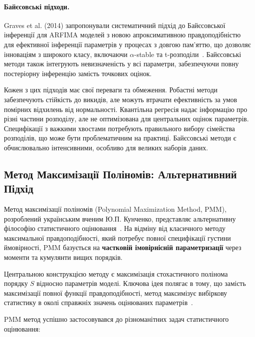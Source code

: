 \documentclass[12pt,a4paper]{article}
\begin{document}
\paragraph{Байєсовські підходи.} Graves et al. (2014) запропонували систематичний підхід до Байєсовської інференції для ARFIMA моделей з новою апроксимативною правдоподібністю для ефективної інференції параметрів у процесах з довгою пам'яттю, що дозволяє інноваціям з широкого класу, включаючи $\alpha$-stable та t-розподіли~\cite{graves2014efficient}. Байєсовські методи також інтегрують невизначеність у всі параметри, забезпечуючи повну постеріорну інференцію замість точкових оцінок.

Кожен з цих підходів має свої переваги та обмеження. Робастні методи забезпечують стійкість до викидів, але можуть втрачати ефективність за умов помірних відхилень від нормальності. Квантільна регресія надає інформацію про різні частини розподілу, але не оптимізована для центральних оцінок параметрів. Специфікації з важкими хвостами потребують правильного вибору сімейства розподілів, що може бути проблематичним на практиці. Байєсовські методи є обчислювально інтенсивними, особливо для великих наборів даних.

\subsection{Метод Максимізації Поліномів: Альтернативний Підхід}
\label{subsec:pmm_intro}

Метод максимізації поліномів (Polynomial Maximization Method, PMM), розроблений українським вченим Ю.П. Кунченко, представляє альтернативну філософію статистичного оцінювання~\cite{kunchenko1991estimation,kunchenko2002polynomial}. На відміну від класичного методу максимальної правдоподібності, який потребує повної специфікації густини ймовірності, PMM базується на \textbf{частковій імовірнісній параметризації} через моменти та кумулянти вищих порядків.

Центральною конструкцією методу є максимізація стохастичного полінома порядку $S$ відносно параметрів моделі. Ключова ідея полягає в тому, що замість максимізації повної функції правдоподібності, метод максимізує вибіркову статистику в околі справжніх значень оцінюваних параметрів~\cite{kunchenko2002polynomial,kunchenko2006stochastic}.

PMM метод успішно застосовувався до різноманітних задач статистичного оцінювання:
\end{document}
